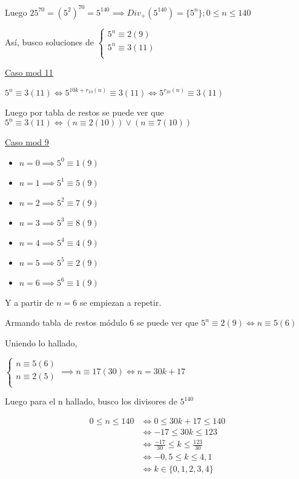 Luego $ 25^{70} = (5^2)^{70} = 5^{140} \implies Div_+(5^{140}) = \{ 5^n \}; 0\leq n \leq 140 $

Así, busco soluciones de $ \begin{cases}
    5^n \equiv 2(9) \\
    5^n \equiv 3(11) \\
\end{cases} $

\underline{Caso mod 11}

$ 5^n \equiv 3(11) \iff 5^{10k+r_{10}(n)} \equiv 3(11) \iff 5^{r_{10}(n)} \equiv 3(11) $

Luego por tabla de restos se puede ver que $ 5^n \equiv 3(11) \iff (n \equiv 2(10)) \vee (n \equiv 7(10)) $

\underline{Caso mod 9}

\begin{itemize}
    \item $ n = 0 \implies 5^0 \equiv 1(9) $
    \item $ n = 1 \implies 5^1 \equiv 5(9) $
    \item $ n = 2 \implies 5^2 \equiv 7(9) $
    \item $ n = 3 \implies 5^3 \equiv 8(9) $
    \item $ n = 4 \implies 5^4 \equiv 4(9) $
    \item $ n = 5 \implies 5^5 \equiv 2(9) $
    \item $ n = 6 \implies 5^6 \equiv 1(9) $
\end{itemize}

Y a partir de $ n = 6 $ se empiezan a repetir.

Armando tabla de restos módulo 6 se puede ver que $ 5^n \equiv 2(9) \iff n \equiv 5(6) $

Uniendo lo hallado,

$ \begin{cases}
    n \equiv 5(6) \\
    n \equiv 2(5) \\
\end{cases} \implies n \equiv 17(30) \iff n = 30k+17$

Luego para el n hallado, busco los divisores de $ 5^{140} $

\begin{align*}
    0 \leq n \leq 140 &\iff 0\leq 30k+17 \leq 140 \\
    &\iff -17 \leq 30k \leq 123 \\
    &\iff \frac{-17}{30} \leq k \leq \frac{123}{30} \\
    &\iff -0,5 \leq k \leq 4,1 \\
    &\iff k \in \{ 0,1,2,3,4 \} \\
\end{align*}

